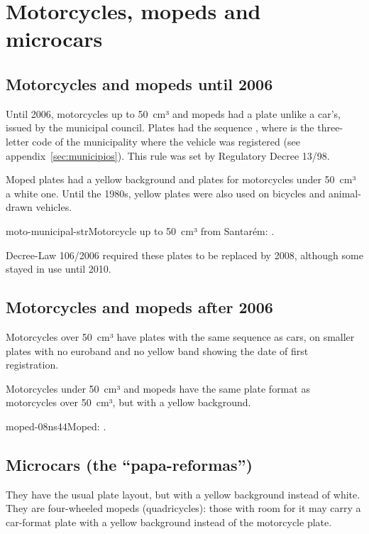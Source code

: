 \section{Motorcycles, mopeds and microcars}

\subsection{Motorcycles and mopeds until 2006}

Until 2006, motorcycles up to 50~cm³ and mopeds had a plate unlike a car's, issued
by the municipal council. Plates had the sequence , where
 is the three-letter code of the municipality where the vehicle was
registered (see appendix~\ref{sec:municipios}). This rule was set by
Regulatory Decree 13/98.

Moped plates had a yellow background and plates for motorcycles under 50~cm³ a
white one. Until the 1980s, yellow plates were also used on bicycles and
animal-drawn vehicles.

%
          {moto-municipal-str}{Motorcycle up to 50~cm³ from Santarém: .}

Decree-Law 106/2006 required these plates to be replaced by 2008, although some
stayed in use until 2010.

\subsection{Motorcycles and mopeds after 2006}

Motorcycles over 50~cm³ have plates with the same sequence as cars, on smaller
plates with no euroband and no yellow band showing the date of first
registration.

Motorcycles under 50~cm³ and mopeds have the same plate format as motorcycles
over 50~cm³, but with a yellow background.

%
          {moped-08ns44}{Moped: .}


\subsection{Microcars (the “papa-reformas”)}

They have the usual plate layout, but with a yellow background instead of white.
They are four-wheeled mopeds (quadricycles): those with room for it may carry a
car-format plate with a yellow background instead of the motorcycle plate.

